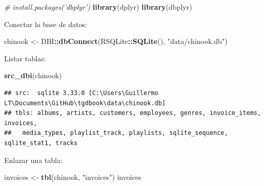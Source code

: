 \documentclass[
]{book}
\newenvironment{Shaded}{\begin{snugshade}}{\end{snugshade}}
\newcommand{\CommentTok}[1]{\textcolor[rgb]{0.56,0.35,0.01}{\textit{#1}}}
\newcommand{\KeywordTok}[1]{\textcolor[rgb]{0.13,0.29,0.53}{\textbf{#1}}}
\newcommand{\NormalTok}[1]{#1}
\newcommand{\OperatorTok}[1]{\textcolor[rgb]{0.81,0.36,0.00}{\textbf{#1}}}
\newcommand{\StringTok}[1]{\textcolor[rgb]{0.31,0.60,0.02}{#1}}
\begin{document}
\begin{Shaded}
\begin{Highlighting}[]
\CommentTok{# install.packages('dbplyr')}
\KeywordTok{library}\NormalTok{(dplyr)}
\KeywordTok{library}\NormalTok{(dbplyr)}
\end{Highlighting}
\end{Shaded}

Conectar la base de datos:

\begin{Shaded}
\begin{Highlighting}[]
\NormalTok{chinook <-}\StringTok{ }\NormalTok{DBI}\OperatorTok{::}\KeywordTok{dbConnect}\NormalTok{(RSQLite}\OperatorTok{::}\KeywordTok{SQLite}\NormalTok{(), }\StringTok{"data/chinook.db"}\NormalTok{)}
\end{Highlighting}
\end{Shaded}

Listar tablas:

\begin{Shaded}
\begin{Highlighting}[]
\KeywordTok{src_dbi}\NormalTok{(chinook)}
\end{Highlighting}
\end{Shaded}

\begin{verbatim}
## src:  sqlite 3.33.0 [C:\Users\Guillermo LT\Documents\GitHub\tgdbook\data\chinook.db]
## tbls: albums, artists, customers, employees, genres, invoice_items, invoices,
##   media_types, playlist_track, playlists, sqlite_sequence, sqlite_stat1, tracks
\end{verbatim}

Enlazar una tabla:

\begin{Shaded}
\begin{Highlighting}[]
\NormalTok{invoices <-}\StringTok{ }\KeywordTok{tbl}\NormalTok{(chinook, }\StringTok{"invoices"}\NormalTok{)}
\NormalTok{invoices}
\end{Highlighting}
\end{Shaded}
\end{document}
